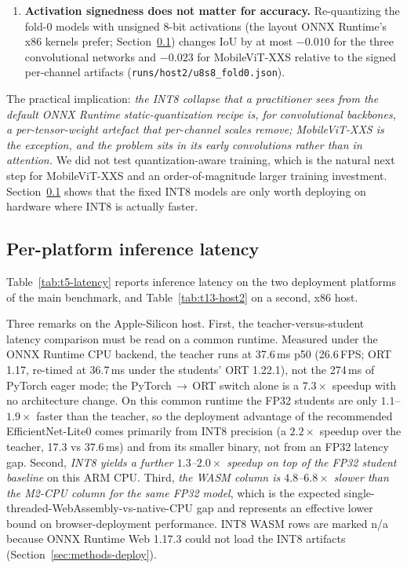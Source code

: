 \begin{enumerate}
\item \textbf{Activation signedness does not matter for accuracy.} Re-quantizing the fold-0 models with unsigned 8-bit activations (the layout ONNX Runtime's x86 kernels prefer; Section~\ref{sec:results-latency}) changes IoU by at most $-0.010$ for the three convolutional networks and $-0.023$ for MobileViT-XXS relative to the signed per-channel artifacts (\texttt{runs/host2/u8s8\_fold0.json}).
\end{enumerate}

The practical implication: \emph{the INT8 collapse that a practitioner sees from the default ONNX Runtime static-quantization recipe is, for convolutional backbones, a per-tensor-weight artefact that per-channel scales remove; MobileViT-XXS is the exception, and the problem sits in its early convolutions rather than in attention.} We did not test quantization-aware training, which is the natural next step for MobileViT-XXS and an order-of-magnitude larger training investment. Section~\ref{sec:results-latency} shows that the fixed INT8 models are only worth deploying on hardware where INT8 is actually faster.

\subsection{Per-platform inference latency}
\label{sec:results-latency}

Table~\ref{tab:t5-latency} reports inference latency on the two deployment platforms of the main benchmark, and Table~\ref{tab:t13-host2} on a second, x86 host.



Three remarks on the Apple-Silicon host. First, the teacher-versus-student latency comparison must be read on a common runtime. Measured under the ONNX Runtime CPU backend, the teacher runs at 37.6\,ms p50 (26.6\,FPS; ORT 1.17, re-timed at 36.7\,ms under the students' ORT 1.22.1), not the 274\,ms of PyTorch eager mode; the PyTorch\,$\rightarrow$\,ORT switch alone is a $7.3\times$ speedup with no architecture change. On this common runtime the FP32 students are only $1.1$--$1.9\times$ faster than the teacher, so the deployment advantage of the recommended EfficientNet-Lite0 comes primarily from INT8 precision (a $2.2\times$ speedup over the teacher, 17.3 vs 37.6\,ms) and from its smaller binary, not from an FP32 latency gap. Second, \emph{INT8 yields a further $1.3$--$2.0\times$ speedup on top of the FP32 student baseline} on this ARM CPU. Third, \emph{the WASM column is $4.8$--$6.8\times$ slower than the M2-CPU column for the same FP32 model}, which is the expected single-threaded-WebAssembly-vs-native-CPU gap and represents an effective lower bound on browser-deployment performance. INT8 WASM rows are marked n/a because ONNX Runtime Web 1.17.3 could not load the INT8 artifacts (Section~\ref{sec:methods-deploy}).

